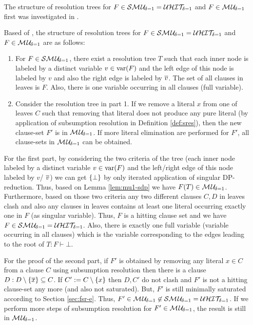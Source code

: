 \documentclass{report}
\begin{document}
The structure of resolution trees for $F \in \mathcal{S}\mathcal{M\hspace{0.8pt}U}_{\!\delta=1}=\mathcal{U}\mathcal{HIT}_{\!\!\delta=1} $ and  $F \in \mathcal{M\hspace{0.8pt}U}_{\!\delta=1}$ first was investigated in \cite{KullmannZhao2016UHitSAT}. 
\begin{lem}\label{lem:mu1-build}
Based of \cite{KullmannZhao2016UHitSAT}, the structure of resolution trees  for $F \in \mathcal{S}\mathcal{M\hspace{0.8pt}U}_{\!\delta=1}=\mathcal{U}\mathcal{HIT}_{\!\!\delta=1} $ and  $F \in \mathcal{M\hspace{0.8pt}U}_{\!\delta=1}$ are as follows:
  \begin{enumerate}
  \item For $F \in \mathcal{S}\mathcal{M\hspace{0.8pt}U}_{\!\delta=1}$, there exist a resolution tree $T$ such that each inner node is labeled by a distinct variable $v \in \operatorname{var}(F)$ and the left edge of this node is labeled by $v$ and also the right edge is labeled by $\overline v$. The set of all clauses in leaves is $F$. Also, there is one variable occurring in all clauses (full variable). 
  \item Consider the resolution tree in part 1. If we remove a literal $x$ from one of leaves $C$ such that removing that literal does not produce any pure literal (by application of subsumption resolution in Definition \ref{def:sres}), then the new clause-set $F'$ is in $ \mathcal{M\hspace{0.8pt}U}_{\!\delta=1}$. If more literal elimination are performed for $F'$, all clause-sets in $ \mathcal{M\hspace{0.8pt}U}_{\!\delta=1}$ can be obtained.
  \end{enumerate}
\end{lem}
\begin{prf}
For the first part, by considering the two criteria of the tree (each inner node labeled by a distinct variable $v \in \operatorname{var}(F)$ and the left/right edge of this node labeled by $v$/ $\overline v$) we can get $\{ \bot \}$ by only iterated application of singular DP-reduction. Thus, based on Lemma \ref{lem:mu1-sdp} we have $F(T) \in  \mathcal{M\hspace{0.8pt}U}_{\!\delta=1}$. Furthermore, based on those two criteria any two different clauses $C,D$ in leaves clash and also any clauses in leaves contains at least one literal occurring exactly one in $F$ (as singular variable). Thus, $F$ is a hitting clause set and we have $F \in \mathcal{S}\mathcal{M\hspace{0.8pt}U}_{\!\delta=1}=\mathcal{U}\mathcal{HIT}_{\!\!\delta=1} $. Also, there is exactly one full variable (variable occurring in all clauses) which is the variable corresponding to the edges leading to the root of $T:F \vdash \bot$.
 
For the proof of the second part, if $F'$ is obtained by removing any literal $x \in C$ from a clause $C$ using subsumption resolution then there is a clause $D:D \setminus \{ \overline x \} \subseteq C$. If $C':=C \setminus \{ x \}$ then $D,C'$ do not clash and $F'$ is not a hitting clause-set any more (and also not saturated). But, $F'$ is still minimally saturated according to Section \ref{sec:fsr-e}. Thus, $F'\in  \mathcal{M\hspace{0.8pt}U}_{\!\delta=1} \not \in \mathcal{S}\mathcal{M\hspace{0.8pt}U}_{\!\delta=1}=\mathcal{U}\mathcal{HIT}_{\!\!\delta=1}$. If we perform more steps of subsumption resolution for $F'\in  \mathcal{M\hspace{0.8pt}U}_{\!\delta=1}$, the result is still in $ \mathcal{M\hspace{0.8pt}U}_{\!\delta=1}$. 
\end{prf}
\end{document}
